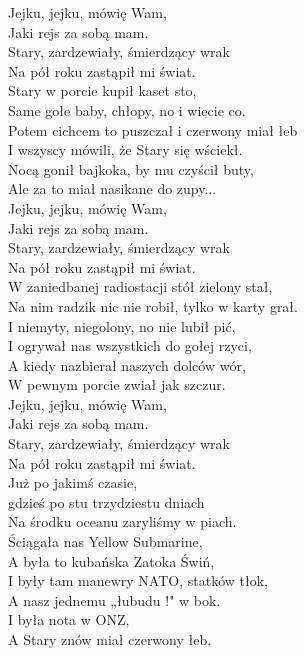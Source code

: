 Jejku, jejku, mówię Wam, \\
Jaki rejs za sobą mam. \\
Stary, zardzewiały, śmierdzący wrak \\
Na pół roku zastąpił mi świat. \\

Stary w porcie kupił kaset sto, \\
Same gołe baby, chłopy, no i wiecie co. \\
Potem cichcem to puszczał i czerwony miał łeb \\
I wszyscy mówili, że Stary się wściekł. \\
Nocą gonił bajkoka, by mu czyścił buty, \\
Ale za to miał nasikane do zupy... \\

Jejku, jejku, mówię Wam, \\
Jaki rejs za sobą mam. \\
Stary, zardzewiały, śmierdzący wrak \\
Na pół roku zastąpił mi świat. \\

W zaniedbanej radiostacji stół zielony stał, \\
Na nim radzik nic nie robił, tylko w karty grał. \\
I niemyty, niegolony, no nie lubił pić, \\
I ogrywał nas wszystkich do gołej rzyci, \\
A kiedy nazbierał naszych dolców wór, \\
W pewnym porcie zwiał jak szczur. \\

Jejku, jejku, mówię Wam, \\
Jaki rejs za sobą mam. \\
Stary, zardzewiały, śmierdzący wrak \\
Na pół roku zastąpił mi świat. \\

Już po jakimś czasie, \\
gdzieś po stu trzydziestu dniach \\
Na środku oceanu zaryliśmy w piach. \\
Ściągała nas Yellow Submarine, \\
A była to kubańska Zatoka Świń, \\
I były tam manewry NATO, statków tłok, \\
A nasz jednemu „łubudu !" w bok. \\
I była nota w ONZ, \\
A Stary znów miał czerwony łeb. \\


